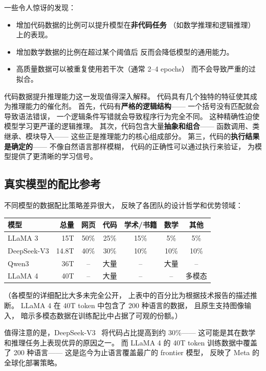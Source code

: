 一些令人惊讶的发现：
\begin{itemize}[noitemsep]
  \item 增加代码数据的比例可以提升模型在\textbf{非代码任务}
        （如数学推理和逻辑推理）上的表现。
  \item 增加数学数据的比例在超过某个阈值后
        反而会降低模型的通用能力。
  \item 高质量数据可以被重复使用若干次（通常 2--4 epochs）
        而不会导致严重的过拟合。
\end{itemize}

代码数据提升推理能力这一发现值得深入解释。
代码具有几个独特的特征使其成为推理能力的催化剂。
首先，代码有\textbf{严格的逻辑结构}——
一个括号没有匹配就会导致语法错误，
一个逻辑条件写错就会导致程序行为完全不同。
这种精确性迫使模型学习更严谨的逻辑推理。
其次，代码包含大量\textbf{抽象和组合}——
函数调用、类继承、模块导入——
这些正是推理能力的核心组成部分。
第三，代码的\textbf{执行结果是确定的}——
不像自然语言那样模糊，
代码的正确性可以通过执行来验证，
为模型提供了更清晰的学习信号。

\subsection{真实模型的配比参考}

不同模型的数据配比策略差异很大，
反映了各团队的设计哲学和优势领域：

\begin{center}
\small
\begin{tabular}{lrccccc}
\hline
\textbf{模型} & \textbf{总量} & \textbf{网页} & \textbf{代码} & \textbf{学术/书籍} & \textbf{数学} & \textbf{其他} \\
\hline
LLaMA 3    & 15T  & 50\% & 25\% & 15\% & 5\%  & 5\%  \\
DeepSeek-V3 & 14.8T & 40\% & 30\% & 10\% & 10\% & 10\% \\
Qwen3      & 36T  & --   & 大量 & --   & 大量 & --   \\
LLaMA 4    & 40T  & --   & 大量 & --   & --   & 多模态 \\
\hline
\end{tabular}
\end{center}

（各模型的详细配比大多未完全公开，
上表中的百分比为根据技术报告的描述推断。
LLaMA 4 在 40T token 中包含了 200 种语言的数据，
且原生支持图像输入，
暗示多模态数据在训练配比中占据了可观的份额。）

值得注意的是，DeepSeek-V3~\cite{deepseekv3}
将代码占比提高到约 30\%——
这可能是其在数学和推理任务上表现优异的原因之一。
而 LLaMA 4 的 40T token 训练数据中覆盖了 200 种语言——
这是迄今为止语言覆盖最广的 frontier 模型，
反映了 Meta 的全球化部署策略。

